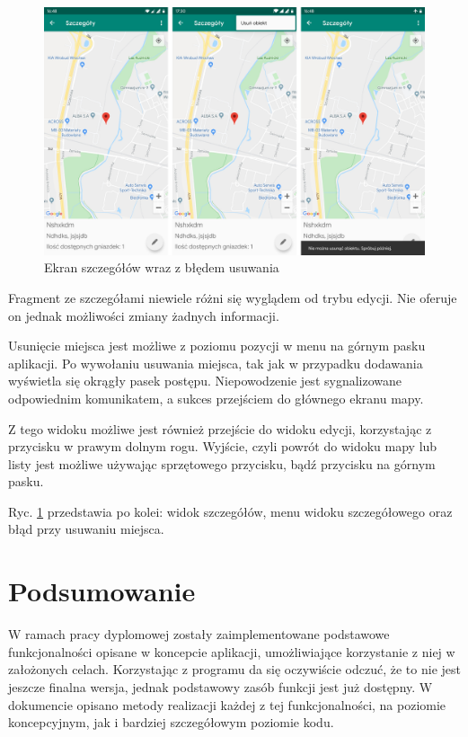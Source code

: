\documentclass[polish,polish,a4paper,12pt]{article}
\let\sectioncmd\section
\renewcommand{\section}{\clearpage\sectioncmd}
\begin{document}
	\begin{figure}[H]
		\centering
		\includegraphics[width = \textwidth]{screenshot-detail}
		\caption{Ekran szczegółów wraz z błędem usuwania}
		\label{fig:screenshotdetail}
	\end{figure}

	Fragment ze szczegółami niewiele różni się wyglądem od trybu edycji. Nie oferuje on jednak możliwości zmiany żadnych informacji.

	Usunięcie miejsca jest możliwe z poziomu pozycji w menu na górnym pasku aplikacji. Po wywołaniu usuwania miejsca, tak jak w przypadku dodawania wyświetla się okrągły pasek postępu. Niepowodzenie jest sygnalizowane odpowiednim komunikatem, a sukces przejściem do głównego ekranu mapy.

	Z tego widoku możliwe jest również przejście do widoku edycji, korzystając z przycisku w prawym dolnym rogu. Wyjście, czyli powrót do widoku mapy lub listy jest możliwe używając sprzętowego przycisku, bądź przycisku na górnym pasku.

	Ryc. \ref{fig:screenshotdetail} przedstawia po kolei: widok szczegółów, menu widoku szczegółowego oraz błąd przy usuwaniu miejsca.

\section{Podsumowanie}\label{summary}

W ramach pracy dyplomowej zostały zaimplementowane podstawowe funkcjonalności opisane w koncepcie aplikacji, umożliwiające korzystanie z niej w założonych celach. Korzystając z programu da się oczywiście odczuć, że to nie jest jeszcze finalna wersja, jednak podstawowy zasób funkcji jest już dostępny. W dokumencie opisano metody realizacji każdej z tej funkcjonalności, na poziomie koncepcyjnym, jak i bardziej szczegółowym poziomie kodu.
\end{document}
